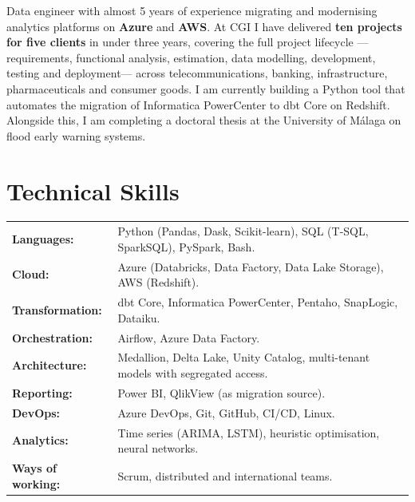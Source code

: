 \documentclass[10pt]{article}
\begin{document}
\pagestyle{others}\thispagestyle{first_page}

\newcommand{\experience}[4]{
    \textbf{#1} \hfill #2 \\
    \textit{#3} \hfill #4 \\
}

\newcommand{\cliente}[2]{
    \vspace{0.15cm}
    \textbf{#1} \hfill \textit{#2} \\
    \vspace{-0.2cm}
}

\begingroup
\justifying
Data engineer with almost 5 years of experience migrating and modernising analytics platforms on \textbf{Azure} and \textbf{AWS}. At CGI I have delivered \textbf{ten projects for five clients} in under three years, covering the full project lifecycle —requirements, functional analysis, estimation, data modelling, development, testing and deployment— across telecommunications, banking, infrastructure, pharmaceuticals and consumer goods. I am currently building a Python tool that automates the migration of Informatica PowerCenter to dbt Core on Redshift. Alongside this, I am completing a doctoral thesis at the University of Málaga on flood early warning systems.
\par
\endgroup

\section{Technical Skills}

\begin{tabular}{p{} p{}}
\textbf{Languages:} & Python (Pandas, Dask, Scikit-learn), SQL (T-SQL, SparkSQL), PySpark, Bash. \\
\textbf{Cloud:} & Azure (Databricks, Data Factory, Data Lake Storage), AWS (Redshift). \\
\textbf{Transformation:} & dbt Core, Informatica PowerCenter, Pentaho, SnapLogic, Dataiku. \\
\textbf{Orchestration:} & Airflow, Azure Data Factory. \\
\textbf{Architecture:} & Medallion, Delta Lake, Unity Catalog, multi-tenant models with segregated access. \\
\textbf{Reporting:} & Power BI, QlikView (as migration source). \\
\textbf{DevOps:} & Azure DevOps, Git, GitHub, CI/CD, Linux. \\
\textbf{Analytics:} & Time series (ARIMA, LSTM), heuristic optimisation, neural networks. \\
\textbf{Ways of working:} & Scrum, distributed and international teams. \\
\end{tabular}
\end{document}

